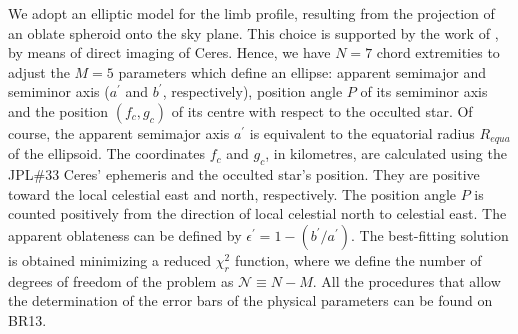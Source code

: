 \documentclass[useAMS,usenatbib]{mn2e}
\begin{document}
We adopt an elliptic model for the limb profile, resulting from the projection of an oblate spheroid onto the sky plane. This choice is supported by the work of \cite{Drummond2014}, by means of direct imaging of Ceres. Hence, we have $N=7$ chord extremities to adjust the $M=5$ parameters which define an ellipse: apparent semimajor and semiminor axis ($a^\prime$ and $b^\prime$, respectively), position angle $P$ of its semiminor axis and the position $(f_c,g_c)$ of its centre with respect to the occulted star. 
Of course, the apparent semimajor axis {$a^\prime$} is equivalent to the equatorial radius $R_{equa}$ of the ellipsoid.
The coordinates $f_{c}$ and $g_{c}$, in kilometres, are calculated using the JPL\#33 Ceres' ephemeris \citep{Giorgini1996} and the occulted star's position. They are positive toward the local celestial east and north, respectively. The position angle $P$ is counted positively from the direction of local celestial north to celestial east. The apparent oblateness can be defined by $\epsilon^\prime = 1 - (b^\prime/a^\prime)$. The best-fitting solution is obtained minimizing a reduced $\chi^{2}_{r}$ function, where we define the number of degrees of freedom of the problem as $\mathcal{N} \equiv N - M$.  All the procedures that allow the determination of the error bars of the physical parameters can be found on BR13.

\end{document}

